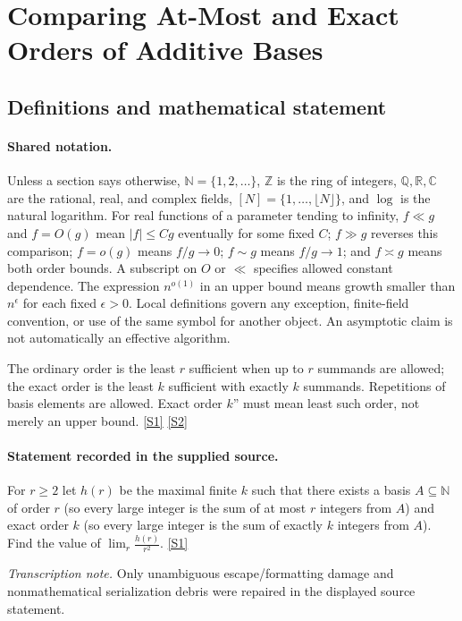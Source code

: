 \documentclass[11pt,a4paper]{article}
\newcommand{\N}{\mathbb{N}}
\newcommand{\Z}{\mathbb{Z}}
\newcommand{\Q}{\mathbb{Q}}
\newcommand{\R}{\mathbb{R}}
\newcommand{\C}{\mathbb{C}}
\newcommand{\sref}[2]{\hyperlink{source:#1:#2}{[S#2]}}
\begin{document}
\section{Comparing At-Most and Exact Orders of Additive Bases}\label{statement}


\subsection{Definitions and mathematical statement}

\paragraph{Shared notation.}Unless a section says otherwise, $\N=\{1,2,\ldots\}$,
$\Z$ is the ring of integers, $\Q,\R,\C$ are the rational, real, and complex
fields, $[N]=\{1,\ldots,\lfloor N\rfloor\}$, and $\log$ is the natural
logarithm. For real functions of a parameter tending to infinity,
$f\ll g$ and $f=O(g)$ mean $|f|\leq Cg$ eventually for some fixed $C$;
$f\gg g$ reverses this comparison; $f=o(g)$ means $f/g\to0$;
$f\sim g$ means $f/g\to1$; and $f\asymp g$ means both order bounds.
A subscript on $O$ or $\ll$ specifies allowed constant dependence.
The expression $n^{o(1)}$ in an upper bound means growth smaller than
$n^\epsilon$ for each fixed $\epsilon>0$. Local definitions govern any
exception, finite-field convention, or use of the same symbol for another
object. An asymptotic claim is not automatically an effective algorithm.



The ordinary order is the least $r$ sufficient when up to $r$ summands are allowed; the exact order is the least $k$ sufficient with exactly $k$ summands. Repetitions of basis elements are allowed. Exact order $k$'' must mean least such order, not merely an upper bound. \sref{statement}{1} \sref{statement}{2}

\paragraph{Statement recorded in the supplied source.}
For $r\geq 2$ let $h(r)$ be the maximal finite $k$ such that there exists a basis $A\subseteq \mathbb{N}$ of order $r$ (so every large integer is the sum of at most $r$ integers from $A$) and exact order $k$ (so every large integer is the sum of exactly $k$ integers from $A$).
Find the value of $ \lim_r \frac{h(r)}{r^2}. $ \sref{statement}{1}

{\small\emph{Transcription note.} Only unambiguous escape/formatting damage and nonmathematical serialization debris were repaired in the displayed source statement.}
\end{document}
